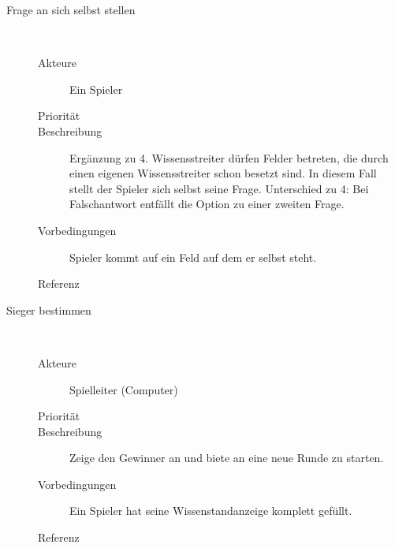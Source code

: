 \documentclass{scrartcl} %
\begin{document}
\begin{description}
   \item[Frage an sich selbst stellen]~\par
   \begin{description}
      \item[Akteure] Ein Spieler
      \item[Priorität]
      \item[Beschreibung] Ergänzung zu 4. Wissensstreiter dürfen Felder betreten, die durch einen eigenen Wissensstreiter schon besetzt sind. In diesem Fall stellt der Spieler sich selbst seine Frage. Unterschied zu 4: Bei Falschantwort entfällt die Option zu einer zweiten Frage.
      \item[Vorbedingungen] Spieler kommt auf ein Feld auf dem er selbst steht. %
      \item[Referenz] 
   \end{description}
\end{description}
\begin{description}
   \item[Sieger bestimmen]~\par
   \begin{description}
      \item[Akteure] Spielleiter (Computer)
      \item[Priorität]
      \item[Beschreibung] Zeige den Gewinner an und biete an eine neue Runde zu starten.
      \item[Vorbedingungen] Ein Spieler hat seine Wissenstandanzeige komplett gefüllt.
      \item[Referenz] 
   \end{description}
\end{description}
\end{document}
